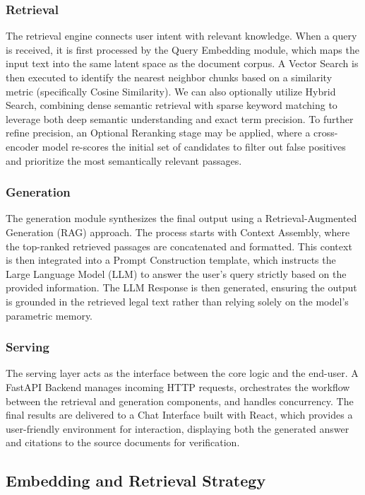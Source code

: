 \documentclass[letterpaper]{article} %
\begin{document}
\subsubsection{Retrieval}
The retrieval engine connects user intent with relevant knowledge. When a query is received, it is first processed by the {Query Embedding} module, which maps the input text into the same latent space as the document corpus. A {Vector Search} is then executed to identify the nearest neighbor chunks based on a similarity metric (specifically Cosine Similarity). We can also optionally utilize Hybrid Search, combining dense semantic retrieval with sparse keyword matching to leverage both deep semantic understanding and exact term precision. To further refine precision, an {Optional Reranking} stage may be applied, where a cross-encoder model re-scores the initial set of candidates to filter out false positives and prioritize the most semantically relevant passages.

\subsubsection{Generation}
The generation module synthesizes the final output using a Retrieval-Augmented Generation (RAG) approach. The process starts with {Context Assembly}, where the top-ranked retrieved passages are concatenated and formatted. This context is then integrated into a {Prompt Construction} template, which instructs the Large Language Model (LLM) to answer the user's query strictly based on the provided information. The {LLM Response} is then generated, ensuring the output is grounded in the retrieved legal text rather than relying solely on the model's parametric memory.

\subsubsection{Serving}
The serving layer acts as the interface between the core logic and the end-user. A FastAPI Backend manages incoming HTTP requests, orchestrates the workflow between the retrieval and generation components, and handles concurrency. The final results are delivered to a Chat Interface built with React, which provides a user-friendly environment for interaction, displaying both the generated answer and citations to the source documents for verification.

\subsection{Embedding and Retrieval Strategy}
\end{document}

